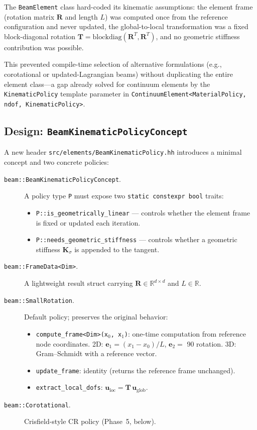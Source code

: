 The \texttt{BeamElement} class hard-coded its kinematic assumptions:
the element frame (rotation matrix $\mathbf{R}$ and length $L$) was
computed once from the reference configuration and never updated,
the global-to-local transformation was a fixed block-diagonal
rotation $\mathbf{T}=\mathrm{blockdiag}(\mathbf{R}^T,
\mathbf{R}^T)$, and no geometric stiffness contribution was
possible.

This prevented compile-time selection of alternative formulations
(e.g., corotational or updated-Lagrangian beams) without duplicating
the entire element class---a gap already solved for continuum elements
by the \texttt{KinematicPolicy} template parameter in
\texttt{ContinuumElement<MaterialPolicy, ndof, KinematicPolicy>}.

\subsection{Design: \texttt{BeamKinematicPolicyConcept}}

A new header \texttt{src/elements/BeamKinematicPolicy.hh} introduces
a minimal concept and two concrete policies:

\begin{description}
  \item[\texttt{beam::BeamKinematicPolicyConcept}.]
    A policy type \texttt{P} must expose two \texttt{static constexpr
    bool} traits:
    \begin{itemize}
      \item \texttt{P::is\_geometrically\_linear} --- controls whether
            the element frame is fixed or updated each iteration.
      \item \texttt{P::needs\_geometric\_stiffness} --- controls whether
            a geometric stiffness $\mathbf{K}_\sigma$ is appended to
            the tangent.
    \end{itemize}

  \item[\texttt{beam::FrameData<Dim>}.]
    A lightweight result struct carrying $\mathbf{R}\in\mathbb{R}^{d
    \times d}$ and $L\in\mathbb{R}$.

  \item[\texttt{beam::SmallRotation}.]
    Default policy; preserves the original behavior:
    \begin{itemize}
      \item \texttt{compute\_frame<Dim>(x$_0$, x$_1$)}: one-time
            computation from reference node coordinates.  2D:
            $\mathbf{e}_1=(x_1-x_0)/L$, $\mathbf{e}_2=$ 90\textdegree{}
            rotation.  3D: Gram--Schmidt with a reference vector.
      \item \texttt{update\_frame}: identity (returns the reference
            frame unchanged).
      \item \texttt{extract\_local\_dofs}: $\mathbf{u}_{\text{loc}} =
            \mathbf{T}\,\mathbf{u}_{\text{glob}}$.
    \end{itemize}

  \item[\texttt{beam::Corotational}.]
    Crisfield-style CR policy (Phase~5, below).
\end{description}

